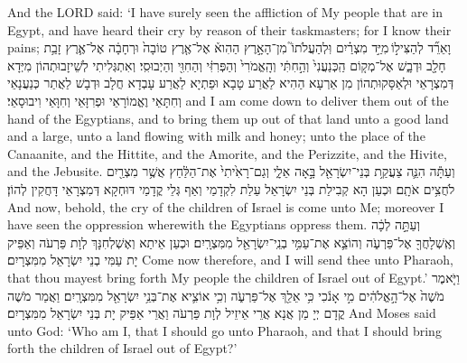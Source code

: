 {{And the LORD said: ‘I have surely seen the affliction of My people that are in Egypt, and have heard their cry by reason of their taskmasters; for I know their pains;}{}
{וָאֵרֵ֞ד לְהַצִּיל֣וֹ \legarmeh  מִיַּ֣ד מִצְרַ֗יִם וּֽלְהַעֲלֹתוֹ֮ מִן־הָאָ֣רֶץ הַהִוא֒ אֶל־אֶ֤רֶץ טוֹבָה֙ וּרְחָבָ֔ה אֶל־אֶ֛רֶץ זָבַ֥ת חָלָ֖ב וּדְבָ֑שׁ אֶל־מְק֤וֹם הַֽכְּנַעֲנִי֙ וְהַ֣חִתִּ֔י וְהָֽאֱמֹרִי֙ וְהַפְּרִזִּ֔י וְהַחִוִּ֖י וְהַיְבוּסִֽי׃}
{וְאִתְגְּלִיתִי לְשֵׁיזָבוּתְהוֹן מִיְּדָא דְּמִצְרָאֵי וּלְאַסָּקוּתְהוֹן מִן אַרְעָא הַהִיא לַאֲרַע טָבָא וּפַתְיָא לַאֲרַע עָבְדָא חֲלָב וּדְבָשׁ לַאֲתַר כְּנַעֲנָאֵי וְחִתָּאֵי וֶאֱמוֹרָאֵי וּפְרִזָּאֵי וְחִוָּאֵי וִיבוּסָאֵי׃}
{and I am come down to deliver them out of the hand of the Egyptians, and to bring them up out of that land unto a good land and a large, unto a land flowing with milk and honey; unto the place of the Canaanite, and the Hittite, and the Amorite, and the Perizzite, and the Hivite, and the Jebusite.}{}
{וְעַתָּ֕ה הִנֵּ֛ה צַעֲקַ֥ת בְּנֵי־יִשְׂרָאֵ֖ל בָּ֣אָה אֵלָ֑י וְגַם־רָאִ֙יתִי֙ אֶת־הַלַּ֔חַץ אֲשֶׁ֥ר מִצְרַ֖יִם לֹחֲצִ֥ים אֹתָֽם׃}
{וּכְעַן הָא קְבִילַת בְּנֵי יִשְׂרָאֵל עַלַת לִקְדָמַי וְאַף גְּלֵי קֳדָמַי דּוּחְקָא דְּמִצְרָאֵי דָּחֲקִין לְהוֹן׃}
{And now, behold, the cry of the children of Israel is come unto Me; moreover I have seen the oppression wherewith the Egyptians oppress them.}{}
{וְעַתָּ֣ה לְכָ֔ה וְאֶֽשְׁלָחֲךָ֖ אֶל־פַּרְעֹ֑ה וְהוֹצֵ֛א אֶת־עַמִּ֥י בְנֵֽי־יִשְׂרָאֵ֖ל מִמִּצְרָֽיִם׃
}
{וּכְעַן אֵיתַא וְאֶשְׁלְחִנָּךְ לְוָת פַּרְעֹה וְאַפֵּיק יָת עַמִּי בְנֵי יִשְׂרָאֵל מִמִּצְרָיִם׃}
{Come now therefore, and I will send thee unto Pharaoh, that thou mayest bring forth My people the children of Israel out of Egypt.’}{}
{וַיֹּ֤אמֶר מֹשֶׁה֙ אֶל־הָ֣אֱלֹהִ֔ים מִ֣י אָנֹ֔כִי כִּ֥י אֵלֵ֖ךְ אֶל־פַּרְעֹ֑ה וְכִ֥י אוֹצִ֛יא אֶת־בְּנֵ֥י יִשְׂרָאֵ֖ל מִמִּצְרָֽיִם׃
}
{וַאֲמַר מֹשֶׁה קֳדָם יְיָ מַן אֲנָא אֲרֵי אֵיזֵיל לְוָת פַּרְעֹה וַאֲרֵי אַפֵּיק יָת בְּנֵי יִשְׂרָאֵל מִמִּצְרָיִם׃}
{And Moses said unto God: ‘Who am I, that I should go unto Pharaoh, and that I should bring forth the children of Israel out of Egypt?’}{}
}
